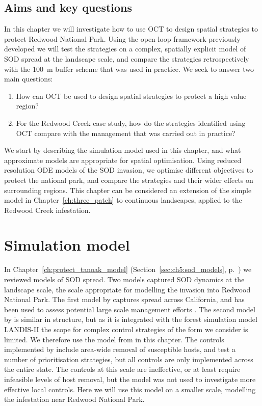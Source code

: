 \subsection{Aims and key questions}

In this chapter we will investigate how to use OCT to design spatial strategies to protect Redwood National Park. Using the open-loop framework previously developed we will test the strategies on a complex, spatially explicit model of SOD spread at the landscape scale, and compare the strategies retrospectively with the \SI{100}{\meter} buffer scheme that was used in practice. We seek to answer two main questions:
\begin{enumerate}
    \item How can OCT be used to design spatial strategies to protect a high value region?
    \item For the Redwood Creek case study, how do the strategies identified using OCT compare with the management that was carried out in practice?
\end{enumerate}

We start by describing the simulation model used in this chapter, and what approximate models are appropriate for spatial optimisation. Using reduced resolution ODE models of the SOD invasion, we optimise different objectives to protect the national park, and compare the strategies and their wider effects on surrounding regions. This chapter can be considered an extension of the simple model in Chapter~\ref{ch:three_patch} to continuous landscapes, applied to the Redwood Creek infestation.

\section{Simulation model}

In Chapter~\ref{ch:protect_tanoak_model} (Section~\ref{sec:ch5:sod_models}, p.~\pageref{sec:ch5:sod_models}) we reviewed models of SOD spread. Two models captured SOD dynamics at the landscape scale, the scale appropriate for modelling the invasion into Redwood National Park. The first model by \citet{meentemeyer_epidemiological_2011} captures spread across California, and has been used to assess potential large scale management efforts \citep{cunniffe_modelling_2016}. The second model by \citet{tonini_modeling_2018} is similar in structure, but as it is integrated with the forest simulation model LANDIS-II \citep{scheller_design_2007} the scope for complex control strategies of the form we consider is limited. We therefore use the model from \citet{meentemeyer_epidemiological_2011} in this chapter. The controls implemented by \citet{cunniffe_modelling_2016} include area-wide removal of susceptible hosts, and test a number of prioritisation strategies, but all controls are only implemented across the entire state. The controls at this scale are ineffective, or at least require infeasible levels of host removal, but the model was not used to investigate more effective local controls. Here we will use this model on a smaller scale, modelling the infestation near Redwood National Park.

